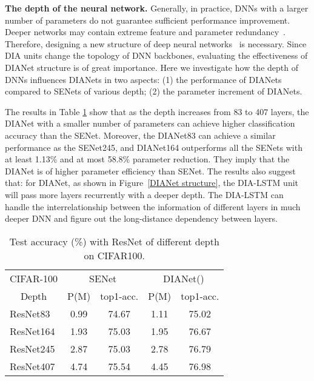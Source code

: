 \documentclass[letterpaper]{article} \usepackage{aaai20}  \usepackage{times}  \usepackage{helvet} \usepackage{courier}  \usepackage[hyphens]{url}  \usepackage{graphicx} \urlstyle{rm} \def\UrlFont{\rm}  \usepackage{graphicx}  \frenchspacing  \setlength{\pdfpagewidth}{8.5in}  \setlength{\pdfpageheight}{11in}  \usepackage{color}
\begin{document}
	\noindent\textbf{The depth of the neural network.} Generally, in practice, DNNs with a larger number of parameters do not guarantee sufficient performance improvement. Deeper networks may contain extreme feature and parameter redundancy~\cite{huang2017densely}. Therefore,  designing a new structure of deep neural networks~\cite{he2016deep,huang2017densely,srivastava2015training,hu2018squeeze,hu2018gather,wang2018non} is necessary. Since DIA units change the topology of DNN backbones, evaluating the effectiveness of DIANet structure is of great importance. Here we investigate how the depth of DNNs influences DIANets in two aspects: (1) the performance of DIANets compared to SENets of various depth; (2) the parameter increment of DIANets. 
	
	The results in Table \ref{tab:DIANet with different depth1} show that as the depth increases from 83 to 407 layers, the DIANet with a smaller number of parameters can achieve higher classification accuracy than the SENet. Moreover, the DIANet83 can achieve a similar performance as the SENet245, and DIANet164 outperforms all the SENets with at least 1.13\% and at most 58.8\% parameter reduction. They imply that the DIANet is of higher parameter efficiency than SENet. The results also suggest that: for DIANet, as shown in Figure~\ref{DIANet structure}, the DIA-LSTM unit will pass more layers recurrently with a deeper depth. The DIA-LSTM can handle the interrelationship between the information of different layers in much deeper DNN and figure out the long-distance dependency between layers. 
		\begin{table}[h]
	  		\small
			\centering
			\begin{tabular}{|l|c|c|c|c|}
				\toprule
				\multicolumn{1}{|c|}{CIFAR-100} & \multicolumn{2}{c|}{SENet} & \multicolumn{2}{c|}{DIANet()} \\
				\cmidrule{2-5}    \multicolumn{1}{|c|}{Depth} & P(M) & top1-acc.  & P(M) & top1-acc. \\
				\midrule
				ResNet83 & 0.99  & 74.67  & 1.11 & 75.02  \\
				ResNet164 & 1.93  & 75.03  & 1.95 & 76.67  \\
				ResNet245 & 2.87  & 75.03  & 2.78 & 76.79  \\
				ResNet407 & 4.74  & 75.54  & 4.45 & 76.98  \\
				\bottomrule
			\end{tabular}\caption{Test accuracy (\%) with ResNet of different depth on CIFAR100.}
			\label{tab:DIANet with different depth1}\end{table}{}	
\end{document}
